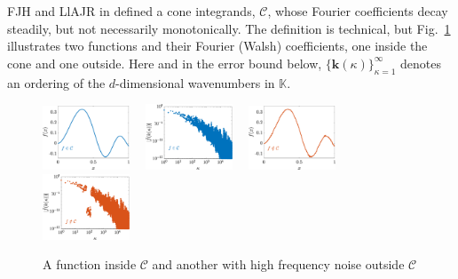\documentclass[11pt]{NSFamsart}
\newcommand{\bbK}{\mathbb{K}}
\newcommand{\bk}{{\boldsymbol{k}}}
\newcommand{\cc}{\mathcal{C}}
\begin{document}
FJH and LlAJR in \cite{HicJim16a,JimHic16a} defined a cone integrands, $\cc$, 
whose Fourier coefficients decay steadily, but  not necessarily monotonically.  The definition is technical, but Fig.\ \ref{GoodBadWalshFig} 
illustrates two functions and their Fourier 
(Walsh) coefficients, one inside the cone and one outside.  Here and in the error bound below, $\{\bk(\kappa)\}_{\kappa = 1}^\infty$ 
denotes an ordering of the $d$-dimensional wavenumbers in $\bbK$.

\begin{figure}[h]
	\centering
	\includegraphics[width = 0.23\textwidth] 
	{ProgramsImages/FunctionWalshFourierCoeffDecay.eps} \ \ 
	\includegraphics[width = 0.23\textwidth] 
	{ProgramsImages/WalshFourierCoeffDecay128.eps} \ \ 
	\includegraphics[width = 0.23\textwidth] 
	{ProgramsImages/FilteredFunctionWalshFourierCoeffDecay.eps} \ \ 
	\includegraphics[width = 0.23\textwidth] 
	{ProgramsImages/WalshFourierCoeffDecayFilter.eps}
	\caption{A function inside $\cc$ and another with high frequency noise outside $\cc$
	\label{GoodBadWalshFig}}
\end{figure}
\end{document}
